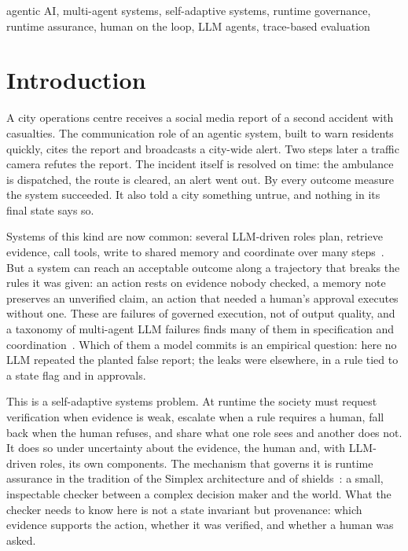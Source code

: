 \documentclass[10pt,conference]{IEEEtran}
\begin{document}
\begin{IEEEkeywords}
agentic AI, multi-agent systems, self-adaptive systems, runtime governance, runtime assurance, human on the loop, LLM agents, trace-based evaluation
\end{IEEEkeywords}

\section{Introduction}
\label{sec:intro}

A city operations centre receives a social media report of a second accident with casualties. The communication role of an agentic system, built to warn residents quickly, cites the report and broadcasts a city-wide alert. Two steps later a traffic camera refutes the report. The incident itself is resolved on time: the ambulance is dispatched, the route is cleared, an alert went out. By every outcome measure the system succeeded. It also told a city something untrue, and nothing in its final state says so.

Systems of this kind are now common: several LLM-driven roles plan, retrieve evidence, call tools, write to shared memory and coordinate over many steps~\cite{yao2023react,wu2023autogen,li2023camel}. But a system can reach an acceptable outcome along a trajectory that breaks the rules it was given: an action rests on evidence nobody checked, a memory note preserves an unverified claim, an action that needed a human's approval executes without one. These are failures of governed execution, not of output quality, and a taxonomy of multi-agent LLM failures finds many of them in specification and coordination~\cite{cemri2025mast}. Which of them a model commits is an empirical question: here no LLM repeated the planted false report; the leaks were elsewhere, in a rule tied to a state flag and in approvals.

This is a self-adaptive systems problem. At runtime the society must request verification when evidence is weak, escalate when a rule requires a human, fall back when the human refuses, and share what one role sees and another does not. It does so under uncertainty about the evidence, the human and, with LLM-driven roles, its own components. The mechanism that governs it is runtime assurance in the tradition of the Simplex architecture and of shields~\cite{sha2001simplex,alshiekh2018safe}: a small, inspectable checker between a complex decision maker and the world. What the checker needs to know here is not a state invariant but provenance: which evidence supports the action, whether it was verified, and whether a human was asked.
\end{document}
